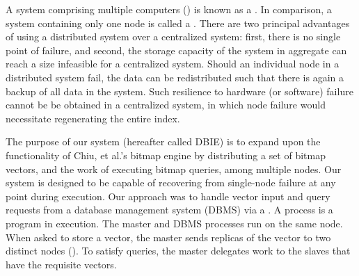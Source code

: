 \par
A system comprising multiple computers () is known as a
. In comparison, a system containing only one node is
called a . There are two principal advantages of using a
distributed system over a centralized system: first, there is no
single point of failure, and second, the storage capacity of the system in
aggregate can reach a size infeasible for a centralized system. Should an
individual node in a distributed system fail, the data can be redistributed such
that there is again a backup of all data in the system. Such resilience to
hardware (or software) failure cannot be be obtained in a centralized system,
in which node failure would necessitate regenerating the entire index.
\par
The purpose of our system (hereafter called DBIE) is to expand upon the
functionality of Chiu, et al.'s bitmap engine by distributing a set of bitmap
vectors, and the work of executing bitmap queries, among multiple nodes. Our
system is designed to be capable of recovering from single-node failure at any
point during execution. Our approach was to handle vector input and query
requests from a database management system (DBMS) via a 
. A process is a program in execution. The master and DBMS
processes run on the same node. When asked to store a vector, the master sends
replicas of the vector to two distinct nodes (). To satisfy
queries, the master delegates work to the slaves that have the requisite
vectors.
\par
%
%
